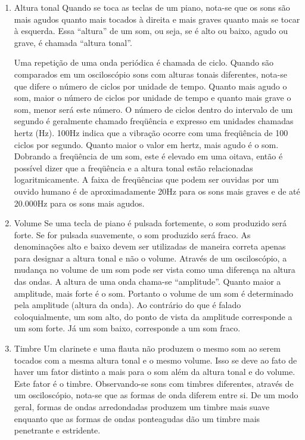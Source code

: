 \begin{enumerate}
\item Altura tonal \newline
Quando se toca as teclas de um piano, nota-se que os sons são mais agudos quanto mais tocados à direita e mais graves quanto mais se tocar à esquerda. Essa “altura” de um som, ou seja, se é alto ou baixo, agudo ou grave, é chamada “altura tonal”.

Uma repetição de uma onda periódica é chamada de ciclo. Quando são comparados em um osciloscópio sons com alturas tonais diferentes, nota-se que difere o número de ciclos por unidade de tempo. Quanto mais agudo o som, maior o número de ciclos por unidade de tempo e quanto mais grave o som, menor será este número. O número de ciclos dentro do intervalo de um segundo é geralmente chamado freqüência e expresso em unidades chamadas hertz (Hz). 100Hz indica que a vibração ocorre com uma freqüência de 100 ciclos por segundo. Quanto maior o valor em hertz, mais agudo é o som. Dobrando a freqüência de um som, este é elevado em uma oitava, então é possível dizer que a freqüência e a altura tonal estão relacionadas logaritmicamente. A faixa de freqüências que podem ser ouvidas por um ouvido humano é de aproximadamente 20Hz para os sons mais graves e de até 20.000Hz para os sons mais agudos.

\item Volume \newline
Se uma tecla de piano é pulsada fortemente, o som produzido será forte. Se for pulsada suavemente, o som produzido será fraco. As denominações alto e baixo devem ser utilizadas de maneira correta apenas para designar a altura tonal e não o volume. Através de um osciloscópio, a mudança no volume de um som pode ser vista como uma diferença na altura das ondas. A altura de uma onda chama-se “amplitude”. Quanto maior a amplitude, mais forte é o som. Portanto o volume de um som é determinado pela amplitude (altura da onda). Ao contrário do que é falado coloquialmente, um som alto, do ponto de vista da amplitude corresponde a um som forte. Já um som baixo, corresponde a um som fraco.

\item Timbre \newline
Um clarinete e uma flauta não produzem o mesmo som ao serem tocados com a mesma altura tonal e o mesmo volume. Isso se deve ao fato de haver um fator distinto a mais para o som além da altura tonal e do volume. Este fator é o timbre. Observando-se sons com timbres diferentes, através de um osciloscópio, nota-se que as formas de onda diferem entre si. De um modo geral, formas de ondas arredondadas produzem um timbre mais suave enquanto que as formas de ondas ponteagudas dão um timbre mais penetrante e estridente.


\end{enumerate}
